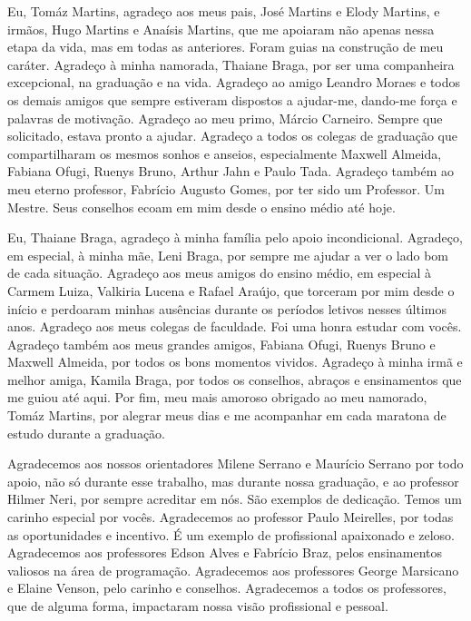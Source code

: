 \begin{agradecimentos}
Eu, Tomáz Martins, agradeço aos meus pais, José Martins e Elody Martins, e irmãos, Hugo Martins e Anaísis Martins, que me apoiaram não apenas nessa etapa da vida, mas em todas as anteriores. Foram guias na construção de meu caráter. Agradeço à minha namorada, Thaiane Braga, por ser uma companheira excepcional, na graduação e na vida. Agradeço ao amigo Leandro Moraes e todos os demais amigos que sempre estiveram dispostos a ajudar-me, dando-me força e palavras de motivação. Agradeço ao meu primo, Márcio Carneiro. Sempre que solicitado, estava pronto a ajudar. Agradeço a todos os colegas de graduação que compartilharam os mesmos sonhos e anseios, especialmente Maxwell Almeida, Fabiana Ofugi, Ruenys Bruno, Arthur Jahn e Paulo Tada. Agradeço também ao meu eterno professor, Fabrício Augusto Gomes, por ter sido um Professor. Um Mestre. Seus conselhos ecoam em mim desde o ensino médio até hoje.

Eu, Thaiane Braga, agradeço à minha família pelo apoio incondicional. Agradeço, em especial, à minha mãe, Leni Braga, por sempre me ajudar a ver o lado bom de cada situação. Agradeço aos meus amigos do ensino médio, em especial à Carmem Luiza, Valkiria Lucena e Rafael Araújo, que torceram por mim desde o início e perdoaram minhas ausências durante os períodos letivos nesses últimos anos. Agradeço aos meus colegas de faculdade. Foi uma honra estudar com vocês. Agradeço também aos meus grandes amigos, Fabiana Ofugi, Ruenys Bruno e Maxwell Almeida, por todos os bons momentos vividos.  Agradeço à minha irmã e melhor amiga, Kamila Braga, por todos os conselhos, abraços e ensinamentos que me guiou até aqui. Por fim, meu mais amoroso obrigado ao meu namorado, Tomáz Martins, por alegrar meus dias e me acompanhar em cada maratona de estudo durante a graduação.

Agradecemos aos nossos orientadores Milene Serrano e Maurício Serrano por todo apoio, não só durante esse trabalho, mas durante nossa graduação, e ao professor Hilmer Neri, por sempre acreditar em nós. São exemplos de dedicação. Temos um carinho especial por vocês. Agradecemos ao professor Paulo Meirelles, por todas as oportunidades e incentivo. É um exemplo de profissional apaixonado e zeloso. Agradecemos aos professores Edson Alves e Fabrício Braz, pelos ensinamentos valiosos na área de programação. Agradecemos aos professores George Marsicano e Elaine Venson, pelo carinho e conselhos. Agradecemos a todos os professores, que de alguma forma, impactaram nossa visão profissional e pessoal. 
\end{agradecimentos}
